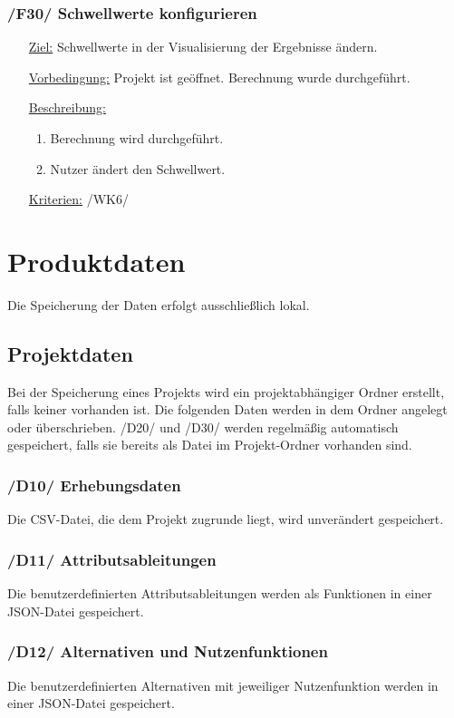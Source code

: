 \documentclass{article}
\begin{document}
\subsubsection*{/F30/ Schwellwerte konfigurieren}
\begin{itemize}
    \item[\underline{Ziel:}] Schwellwerte in der Visualisierung der Ergebnisse ändern.
    \item[\underline{Vorbedingung:}] Projekt ist geöffnet. Berechnung wurde durchgeführt.
    \item[\underline{Beschreibung:}]
    \begin{enumerate}
        \item Berechnung wird durchgeführt.
        \item Nutzer ändert den Schwellwert.
    \end{enumerate}
    \item[\underline{Kriterien:}] /WK6/
\end{itemize}

\clearpage
\section{Produktdaten}
Die Speicherung der Daten erfolgt ausschließlich lokal.
\subsection{Projektdaten}
Bei der Speicherung eines Projekts wird ein projektabhängiger Ordner erstellt, falls keiner vorhanden ist. Die folgenden Daten werden in dem Ordner angelegt oder überschrieben. \newline
/D20/ und /D30/ werden regelmäßig automatisch gespeichert, falls sie bereits als Datei im Projekt-Ordner vorhanden sind.
\subsubsection*{/D10/ Erhebungsdaten}
Die CSV-Datei, die dem Projekt zugrunde liegt, wird unverändert gespeichert.
\subsubsection*{/D11/ Attributsableitungen}
Die benutzerdefinierten Attributsableitungen werden als Funktionen in einer JSON-Datei gespeichert.
\subsubsection*{/D12/ Alternativen und Nutzenfunktionen}
Die benutzerdefinierten Alternativen mit jeweiliger Nutzenfunktion werden in einer JSON-Datei gespeichert.
\end{document}
